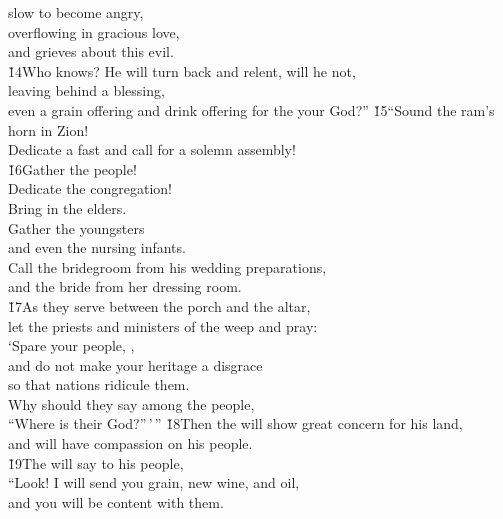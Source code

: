 \begin{poetry}
\poemll    slow to become angry, \\
\poeml overflowing in gracious love, \\
\poemll    and grieves about this evil. \\
\poeml \v{14}Who knows? He will turn back and relent, will he not, \\
\poemll    leaving behind a blessing, \\
\poemlll       even a grain offering and drink offering for the  your God?''
\poeml \v{15}``Sound the ram's horn in Zion! \\
\poemll    Dedicate a fast and call for a solemn assembly! \\
\poeml \v{16}Gather the people! \\
\poemll    Dedicate the congregation! \\
\poeml Bring in the elders. \\
\poemll    Gather the youngsters \\
\poemlll       and even the nursing infants. \\
\poeml Call the bridegroom from his wedding preparations, \\
\poemll    and the bride from her dressing room. \\
\poeml \v{17}As they serve between the porch and the altar, \\
\poemll    let the priests and ministers of the  weep and pray: \\
\poeml `Spare your people, , \\
\poemll    and do not make your heritage a disgrace \\
\poemlll       so that nations ridicule them. \\
\poeml Why should they say among the people, \\
\poemll    ``Where is their God?''\,'\,''
\poeml \v{18}Then the  will show great concern for his land, \\
\poemll    and will have compassion on his people. \\
\poeml \v{19}The  will say to his people, \\
\poemll    ``Look! I will send you grain, new wine, and oil, \\
\poemlll       and you will be content with them. \\

\end{poetry}
